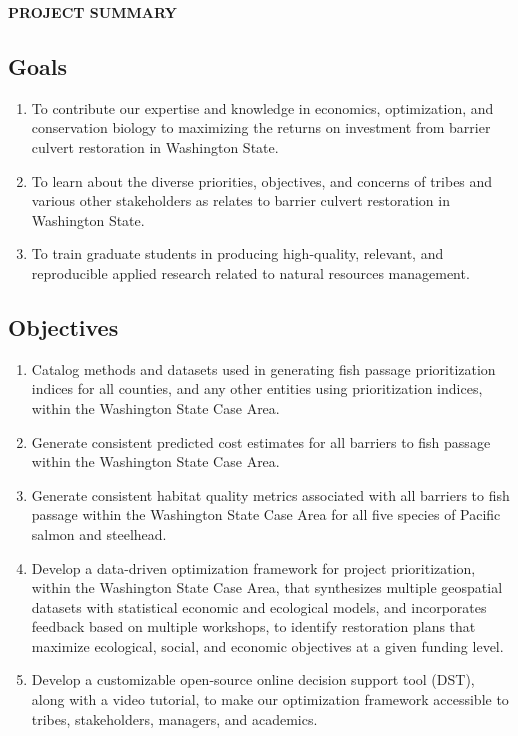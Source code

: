 \documentclass[12pt]{elsarticle}
\begin{document}
	
	\begin{center} \textbf{PROJECT SUMMARY} \end{center}
	
		\subsection*{Goals}
\begin{enumerate}
\item To contribute our expertise and knowledge in economics, optimization, and conservation biology to maximizing the returns on investment from barrier culvert restoration in Washington State.
\item To learn about the diverse priorities, objectives, and concerns of tribes and various other stakeholders as relates to barrier culvert restoration in Washington State.
\item To train graduate students in producing high-quality, relevant, and reproducible applied research related to natural resources management.
\end{enumerate}

\subsection*{Objectives}
\begin{enumerate}
\item Catalog methods and datasets used in generating fish passage prioritization indices for all counties, and any other entities using prioritization indices, within the Washington State Case Area. 
\item Generate consistent predicted cost estimates for all barriers to fish passage within the Washington State Case Area. 
\item Generate consistent habitat quality metrics associated with all barriers to fish passage within the Washington State Case Area for all five species of Pacific salmon and steelhead.
\item Develop a data-driven optimization framework for project prioritization, within the Washington State Case Area, that synthesizes multiple geospatial datasets with statistical economic and ecological models, and incorporates feedback based on multiple workshops, to identify restoration plans that maximize ecological, social, and economic objectives at a given funding level.
\item Develop a customizable open-source online decision support tool (DST), along with a video tutorial, to make our optimization framework accessible to tribes, stakeholders, managers, and academics. 
\end{enumerate}
			
\end{document}
